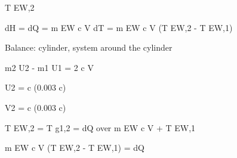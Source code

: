 T EW,2

dH = dQ = m EW c V dT = m EW c V (T EW,2 - T EW,1)

Balance: cylinder, system around the cylinder

m2 U2 - m1 U1 = 2 c V

U2 = c (0.003 c)

V2 = c (0.003 c)

T EW,2 = T g1,2 = dQ over m EW c V + T EW,1

m EW c V (T EW,2 - T EW,1) = dQ